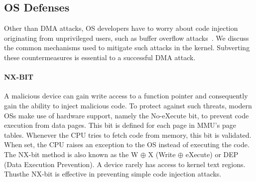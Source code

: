 




\subsection{OS Defenses}

Other than DMA attacks, OS developers have to worry about code injection originating from unprivileged users, such as buffer overflow attacks~\cite{nx, kalsr}.
We discuss the common mechanisms used to mitigate such attacks in the kernel. Subverting these countermeasures is essential to \DIFdelbegin {}\DIFdelend \DIFaddbegin {}\DIFaddend a successful DMA attack.

\paragraph{NX-BIT}\label{sec:nx-bit}

A malicious device can gain write access to a function pointer and consequently gain the ability to inject malicious code. 
To protect against such threats, modern OSs make use of hardware support, namely the No-eXecute bit, to prevent code execution from data pages. This bit is defined for each page in \DIFaddbegin {}\DIFaddend MMU’s page tables. Whenever the CPU tries to fetch code from memory, this bit is validated. When set, the CPU raises an exception to the OS instead of executing the code. The NX-bit method is also known as the W $\oplus$ X (Write $\oplus$ eXecute) or DEP (Data Execution Prevention). 
A \DIFdelbegin {}\DIFdelend \DIFaddbegin {}\DIFaddend device rarely has access to kernel text regions. Thus\DIFaddbegin \DIFadd{, }\DIFaddend the NX-bit is effective in preventing simple code injection attacks.

